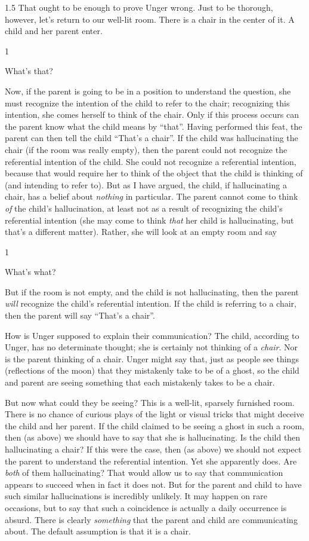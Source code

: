 \documentclass[11pt]{article}
\newcommand{\stage}[3]%
{%
	\begin{spacing}{1}%
	\vspace{0pt}
		\begin{description}[style=nextline, parsep=0pt, leftmargin=15mm, itemindent=-10mm, font=\mdseries]
			\item[\textsc{#1} \emph{#2}] #3
		\end{description}%
	\end{spacing}%
}
\begin{document}
\begin{spacing}{1.5}
That ought to be enough to prove Unger wrong.  Just to be thorough,
however, let's return to our well-lit room.  There is a chair in the
center of it.  A child and her parent enter.

\stage{Child}{(pointing at the chair)}{What's that?}
Now, if the parent is going to be in a position to understand the
question, she must recognize the intention of the child to refer to
the chair; recognizing this intention, she comes herself to think of
the chair.  Only if this process occurs can the parent know what the
child means by ``that''.  Having performed this feat, the parent can
then tell the child ``That's a chair''.  If the child was
hallucinating the chair (if the room was really empty), then the
parent could not recognize the referential intention of the child.
She could not recognize a referential intention, because that would
require her to think of the object that the child is thinking of (and
intending to refer to).  But as I have argued, the child, if
hallucinating a chair, has a belief about {\em nothing} in particular.
The parent cannot come to think {\em of} the child's hallucination, at
least not as a result of recognizing the child's referential intention
(she may come to think {\em that} her child is hallucinating, but
that's a different matter).  Rather, she will look at an empty room
and say

\stage{Parent}{}{What's what?}

But if the room is not empty, and the child is not hallucinating, then
the parent {\em will} recognize the child's referential intention.  If
the child is referring to a chair, then the parent will say ``That's a
chair''.

How is Unger supposed to explain their communication? The child,
according to Unger, has no determinate thought; she is certainly not
thinking of a {\em chair}.  Nor is the parent thinking of a chair.
Unger might say that, just as people see things (reflections of the
moon) that they mistakenly take to be of a ghost, so the child and
parent are seeing something that each mistakenly takes to be a chair.

But now what could they be seeing? This is a well-lit, sparsely
furnished room.  There is no chance of curious plays of the light or
visual tricks that might deceive the child and her parent.  If the
child claimed to be seeing a ghost in such a room, then (as above) we
should have to say that she is hallucinating.  Is the child then
hallucinating a chair? If this were the case, then (as above) we
should not expect the parent to understand the referential intention.
Yet she apparently does.  Are {\em both} of them hallucinating? That
would allow us to say that communication appears to succeed when in
fact it does not.  But for the parent and child to have such similar
hallucinations is incredibly unlikely.  It may happen on rare
occasions, but to say that such a coincidence is actually a daily
occurrence is absurd.  There is clearly {\em something} that the
parent and child are communicating about.  The default assumption is
that it is a chair.


\end{spacing}
\end{document}
